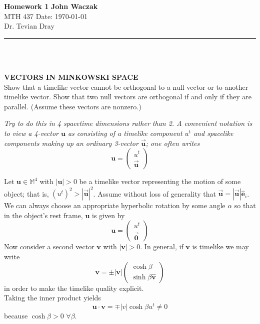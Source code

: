 \documentclass[a4paper, 11pt]{article}
\newcommand{\M}{\mathbb{M}}
\newcommand{\basis}[1]{\hat{\mathbf{e}}_#1}
\newcommand{\unit}[1]{\hat{\boldsymbol{#1}}}
\newcommand{\bvec}[1]{\vec{\boldsymbol{#1}}}
\newcommand{\threevec}[2]{\begin{pmatrix} #1 \\ #2 \end{pmatrix}}
\newenvironment{solution}{%
	\begin{list}{}{%
			\setlength{\topsep}{0pt}%
			\setlength{\leftmargin}{0.5cm}%
			\setlength{\rightmargin}{0.5cm}%
			\setlength{\listparindent}{\parindent}%
			\setlength{\itemindent}{\parindent}%
			\setlength{\parsep}{\parskip}%
		}%
		\item[]}{\end{list}}
\begin{document}
\noindent
\large\textbf{Homework 1} \hfill \textbf{John Waczak} \\
\normalsize MTH 437 \hfill  Date: \today \\
Dr. Tevian Dray %
\par\noindent\rule{\textwidth}{0.4pt} \\\\



\begin{enumerate}[leftmargin=0em, label=\textbf{\arabic*}]
  \item \textbf{VECTORS IN MINKOWSKI SPACE}\\
    Show that a timelike vector cannot be orthogonal to a null vector or to another timelike
    vector. Show that two null vectors are orthogonal if and only if they are parallel. (Assume
    these vectors are nonzero.)

    \textit{Try to do this in 4 spacetime dimensions rather than 2. A convenient
    notation is to view a 4-vector $\mathbf{u}$ as consisting of a timelike
    component $u^t$ and spacelike components making up an ordinary 3-vector
    $\bvec{u}$; one often writes}
    \begin{equation}
      \mathbf{u} = \threevec{u^t}{\bvec{u}}
    \end{equation}

    \begin{solution}
      Let $\mathbf{u}\in\M^4$ with $|\mathbf{u}|>0$ be a timelike vector representing the
      motion of some object; that is, $(u^t)^2>|\bvec{u}|^2$. Assume without loss of
      generality that $\bvec{u} = |\bvec{u}|\basis{i}$. We can always choose an
      appropriate hyperbolic rotation by some angle $\alpha$ so that in the object's
      rest frame, $\mathbf{u}$ is given by
      \begin{equation}
        \mathbf{u} = \threevec{u^t}{\bvec{0}}
      \end{equation}
      Now consider a second vector $\mathbf{v}$ with $|\mathbf{v}|>0$. In
      general, if $\mathbf{v}$ is timelike we may write
      \begin{equation}
        \mathbf{v} = \pm|\mathbf{v}|\threevec{\cosh\beta}{\sinh\beta\unit{v}}
      \end{equation}
      in order to make the timelike quality explicit.\\

      Taking the inner product yields
      \begin{equation}
        \mathbf{u}\cdot\mathbf{v} = \mp|v|\cosh\beta u^t \neq 0
      \end{equation}
      because $\cosh\beta>0$ $\forall \beta$. \\


\end{solution}
\end{enumerate}
\end{document}
